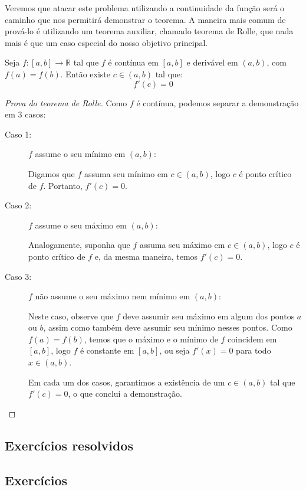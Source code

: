 	Veremos que atacar este problema utilizando a continuidade da função será o caminho que nos permitirá demonstrar o teorema. A maneira mais comum de prová-lo é utilizando um teorema auxiliar, chamado teorema de Rolle, que nada mais é que um caso especial do nosso objetivo principal.
	\begin{teo}
		Seja $f:[a,b]\to \mathbb{R}$ tal que $f$ é contínua em $[a,b]$ e derivável em $(a,b)$, com $f(a) = f(b)$. Então existe $c \in (a,b)$ tal que:
		$$f'(c) = 0$$
	\end{teo}
	\begin{proof}[Prova do teorema de Rolle]
		Como $f$ é contínua, podemos separar a demonstração em 3 casos:
		\begin{description}
			\item[Caso 1:] $f$ assume o seu mínimo em $(a,b)$:
		
			Digamos que $f$ assuma seu mínimo em $c \in (a,b)$, logo $c$ é ponto crítico de $f$. Portanto, $f'(c)=0$.
			\item[Caso 2:] $f$ assume o seu máximo em $(a,b)$:
			
			Analogamente, suponha que $f$ assuma seu máximo em $c \in (a,b)$, logo $c$ é ponto crítico de $f$ e, da mesma maneira, temos $f'(c)=0$.
			\item[Caso 3:] $f$ não assume o seu máximo nem mínimo em $(a,b)$:
			
			Neste caso, observe que $f$ deve assumir seu máximo em algum dos pontos $a$ ou $b$, assim como também deve assumir seu mínimo nesses pontos. Como $f(a) = f(b)$, temos que o máximo e o mínimo de $f$ coincidem em $[a,b]$, logo $f$ é constante em $[a,b]$, ou seja $f'(x)=0$ para todo $x \in (a,b)$.
			
			Em cada um dos casos, garantimos a existência de um $c\in(a,b)$ tal que $f'(c) =0$, o que conclui a demonstração.
		\end{description}
	\end{proof}
\subsection*{Exercícios resolvidos}

\construirExeresol


\subsection*{Exercícios}

\construirExer


